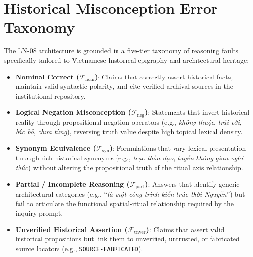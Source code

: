 \documentclass[11pt,a4paper]{article}
\begin{document}
\section{Historical Misconception Error Taxonomy}
The LN-08 architecture is grounded in a five-tier taxonomy of reasoning faults specifically tailored to Vietnamese historical epigraphy and architectural heritage:
\begin{itemize}[leftmargin=*]
    \item \textbf{Nominal Correct ($\mathcal{F}_{\text{nom}}$)}: Claims that correctly assert historical facts, maintain valid syntactic polarity, and cite verified archival sources in the institutional repository.
    \item \textbf{Logical Negation Misconception ($\mathcal{F}_{\text{neg}}$)}: Statements that invert historical reality through propositional negation operators (e.g., \textit{không thuộc}, \textit{trái với}, \textit{bác bỏ}, \textit{chưa từng}), reversing truth value despite high topical lexical density.
    \item \textbf{Synonym Equivalence ($\mathcal{F}_{\text{syn}}$)}: Formulations that vary lexical presentation through rich historical synonyms (e.g., \textit{trục thần đạo}, \textit{tuyến không gian nghi thức}) without altering the propositional truth of the ritual axis relationship.
    \item \textbf{Partial / Incomplete Reasoning ($\mathcal{F}_{\text{part}}$)}: Answers that identify generic architectural categories (e.g., ``\textit{là một công trình kiến trúc thời Nguyễn}'') but fail to articulate the functional spatial-ritual relationship required by the inquiry prompt.
    \item \textbf{Unverified Historical Assertion ($\mathcal{F}_{\text{unver}}$)}: Claims that assert valid historical propositions but link them to unverified, untrusted, or fabricated source locators (e.g., \texttt{SOURCE-FABRICATED}).
\end{itemize}
\end{document}
